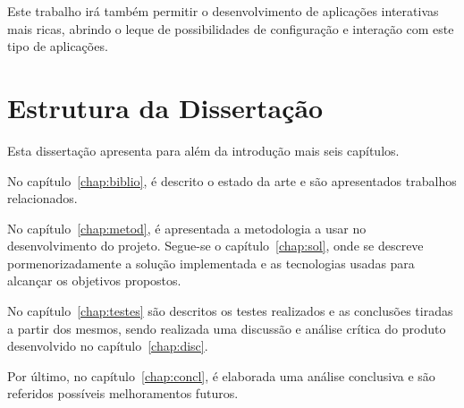 Este trabalho irá também permitir o desenvolvimento de aplicações interativas mais ricas, abrindo o leque de possibilidades de configuração e interação com este tipo de aplicações. 

\section{Estrutura da Dissertação} \label{sec:struct}

Esta dissertação apresenta para além da introdução mais seis capítulos.

No capítulo~\ref{chap:biblio}, é descrito o estado da arte e são
apresentados trabalhos relacionados. 

No capítulo~\ref{chap:metod}, é apresentada a metodologia a usar no desenvolvimento do projeto. Segue-se o capítulo~\ref{chap:sol}, onde se descreve pormenorizadamente a solução implementada e as tecnologias usadas para alcançar os objetivos propostos.

No capítulo~\ref{chap:testes} são descritos os testes realizados e as conclusões tiradas a partir dos mesmos, sendo realizada uma discussão e análise crítica do produto desenvolvido no capítulo~\ref{chap:disc}.

Por último, no capítulo~\ref{chap:concl}, é elaborada uma análise conclusiva e são referidos possíveis melhoramentos futuros.
